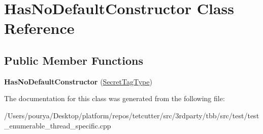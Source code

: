 \hypertarget{classHasNoDefaultConstructor}{}\section{Has\+No\+Default\+Constructor Class Reference}
\label{classHasNoDefaultConstructor}
\subsection*{Public Member Functions}
\begin{DoxyCompactItemize}
\item 
\hypertarget{classHasNoDefaultConstructor_a69ab83a1c5181659c6bcf8ef56a09349}{}{\bfseries Has\+No\+Default\+Constructor} (\hyperlink{structSecretTagType}{Secret\+Tag\+Type})\label{classHasNoDefaultConstructor_a69ab83a1c5181659c6bcf8ef56a09349}

\end{DoxyCompactItemize}


The documentation for this class was generated from the following file\+:\begin{DoxyCompactItemize}
\item 
/\+Users/pourya/\+Desktop/platform/repos/tetcutter/src/3rdparty/tbb/src/test/test\+\_\+enumerable\+\_\+thread\+\_\+specific.\+cpp\end{DoxyCompactItemize}
